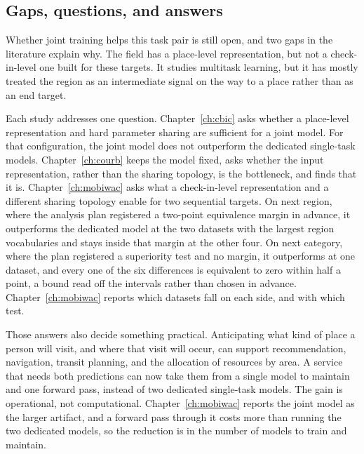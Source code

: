 \subsection{Gaps, questions, and answers}

Whether joint training helps this task pair is still open, and two gaps in the
literature explain why. The field has a place-level representation, but not a
check-in-level one built for these targets. It studies multitask learning, but it has
mostly treated the region as an intermediate signal on the way to a place rather than
as an end target.

Each study addresses one question. Chapter~\ref{ch:cbic} asks whether a
place-level representation and hard parameter sharing are sufficient for a joint
model. For that configuration, the joint model does not outperform the dedicated
single-task models. Chapter~\ref{ch:courb} keeps the model fixed, asks whether the
input representation, rather than the sharing topology, is the bottleneck, and finds
that it is. Chapter~\ref{ch:mobiwac} asks what a check-in-level representation and a
different sharing topology enable for two sequential targets.
On next region, where the analysis plan registered a
two-point equivalence margin in advance, it outperforms the dedicated model at the two datasets
with the largest region vocabularies and stays inside that margin at the other four. On next
category, where the plan registered a superiority test and no margin, it outperforms at one
dataset, and every one of the six differences is equivalent to zero within half a point, a bound
read off the intervals rather than chosen in advance. Chapter~\ref{ch:mobiwac} reports which datasets fall on each
side, and with which test.

Those answers also decide something practical. Anticipating what kind of place a
person will visit, and where that visit will occur, can support recommendation,
navigation, transit planning, and the allocation of resources by area. A service that
needs both predictions can now take them from a single model to maintain and one
forward pass, instead of two dedicated single-task models. The gain is operational,
not computational. Chapter~\ref{ch:mobiwac} reports the joint model as the larger
artifact, and a forward pass through it costs more than running the two dedicated
models, so the reduction is in the number of models to train and maintain.
